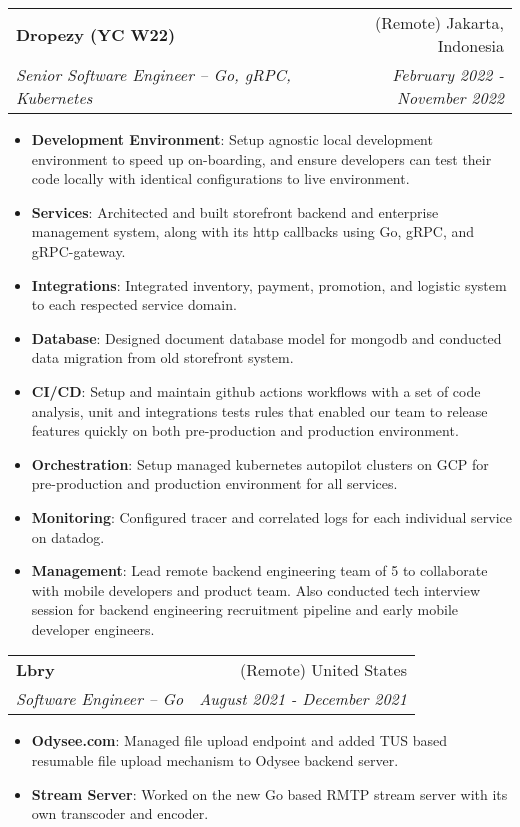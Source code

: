 \documentclass[letterpaper,11pt]{article}
\makeatletter
\newcommand{\resumeItem}[2]{
\item\small{
        \textbf{#1}{: #2 \vspace{-2pt}}
    }
}
\newcommand{\resumeSubheading}[4]{
\vspace{-1pt}\item
    \begin{tabular*}{0.97\textwidth}[t]{l@{\extracolsep{\fill}}r}
        \textbf{#1} & #2 \\
        \textit{\small#3} & \textit{\small #4} \\
    \end{tabular*}\vspace{-5pt}
}
\newcommand{\resumeItemListStart}{\begin{itemize}}
\newcommand{\resumeItemListEnd}{\end{itemize}\vspace{-5pt}}
\makeatother
\begin{document}
\resumeSubheading
{Dropezy (YC W22)}{(Remote) Jakarta, Indonesia}
{Senior Software Engineer -- Go, gRPC, Kubernetes}{February 2022 - November 2022}
\resumeItemListStart
\resumeItem {Development Environment}
{
    Setup agnostic local development environment to speed up on-boarding, and ensure developers can test their code locally with identical
    configurations to live environment.
}
\resumeItem {Services}
{
    Architected and built storefront backend and enterprise management system, along with its http callbacks using Go, gRPC, and gRPC-gateway.
}
\resumeItem {Integrations}
{
    Integrated inventory, payment, promotion, and logistic system to each respected service domain.
}
\resumeItem {Database}
{
    Designed document database model for mongodb and conducted data migration from old storefront system.
}
\resumeItem{CI/CD}
{
    Setup and maintain github actions workflows with a set of code analysis, unit and integrations tests rules that enabled our team
    to release features quickly on both pre-production and production environment.
}
\resumeItem{Orchestration}
{
    Setup managed kubernetes autopilot clusters on GCP for pre-production and production environment for all services.
}
\resumeItem{Monitoring}
{
    Configured tracer and correlated logs for each individual service on datadog.
}
\resumeItem{Management}
{
    Lead remote backend engineering team of 5 to collaborate with mobile developers and product team. Also conducted tech interview session for
    backend engineering recruitment pipeline and early mobile developer engineers.
}
\resumeItemListEnd

\resumeSubheading
{Lbry}{(Remote) United States}
{Software Engineer -- Go}{August 2021 - December 2021}
\resumeItemListStart
\resumeItem{Odysee.com}
{Managed file upload endpoint and added TUS based resumable file upload mechanism to Odysee backend server.}
\resumeItem{Stream Server}
{Worked on the new Go based RMTP stream server with its own transcoder and encoder.}
\resumeItemListEnd
\end{document}
